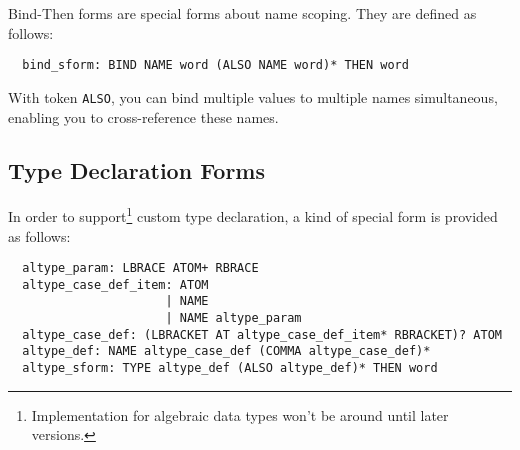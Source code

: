 \documentclass{article}
\begin{document}
Bind-Then forms are special forms about name scoping. They are defined as follows:
\begin{verbatim}
  bind_sform: BIND NAME word (ALSO NAME word)* THEN word
\end{verbatim}

With token \texttt{ALSO}, you can bind multiple values to multiple names simultaneous, enabling you to cross-reference these names.

\subsection{Type Declaration Forms}\label{ssec:tdsf}

In order to support\footnote{Implementation for algebraic data types won't be around until later versions.} custom type declaration, a kind of special form is provided as follows:
\begin{verbatim}
  altype_param: LBRACE ATOM+ RBRACE
  altype_case_def_item: ATOM
                      | NAME
                      | NAME altype_param
  altype_case_def: (LBRACKET AT altype_case_def_item* RBRACKET)? ATOM
  altype_def: NAME altype_case_def (COMMA altype_case_def)*
  altype_sform: TYPE altype_def (ALSO altype_def)* THEN word
\end{verbatim}
\end{document}

